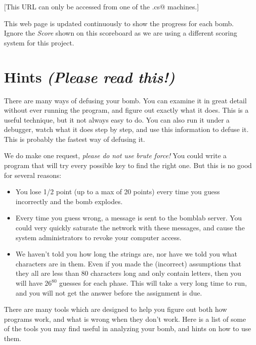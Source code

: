 \documentclass[11pt]{article}
\begin{document}
[This URL can only be accessed from one of the \verb@remote.cs@ machines.]

This web page is updated continuously to show the progress for
each bomb.  Ignore the {\em Score} shown on this scoreboard as
we are using a different scoring system for this project.


\section*{Hints {\em (Please read this!)}}

There are many ways of defusing your bomb.  You can examine it in
great detail without ever running the program, and figure out exactly
what it does.  This is a useful technique, but it not always easy to
do.  You can also run it under a debugger, watch what it does step
by step, and use this information to defuse it.  This is probably the
fastest way of defusing it.

We do make one request, {\em please do not use brute force!}  You could
write a program that will try every possible key to find the right
one.  But this is no good for several reasons:
\begin{itemize}
\item You lose 1/2 point (up to a max of 20 points) 
every time you guess incorrectly and the bomb explodes.  

\item Every time you guess wrong, a message is sent to the bomblab server.  
You could very quickly saturate the network with these messages, and cause
the system administrators to revoke your computer access.

\item We haven't told you how long the strings are, nor have we told you
what characters are in them.  Even if you made the (incorrect) assumptions
that they all are less than 80 characters long and only contain
letters, then you will have $26^{80}$ guesses for each phase.  This will
take a very long time to run, and you will not get the answer before
the assignment is due.
\end{itemize}

There are many tools which are designed to help you figure out both
how programs work, and what is wrong when they don't work.  Here is a
list of some of the tools you may find useful in analyzing your bomb,
and hints on how to use them.
\end{document}
